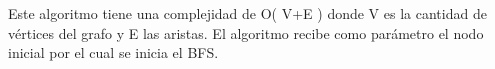 Este algoritmo tiene una complejidad de O( V+E ) donde V es la cantidad de vértices del grafo y E las aristas. El algoritmo recibe como parámetro el nodo inicial por el cual se inicia el BFS.
